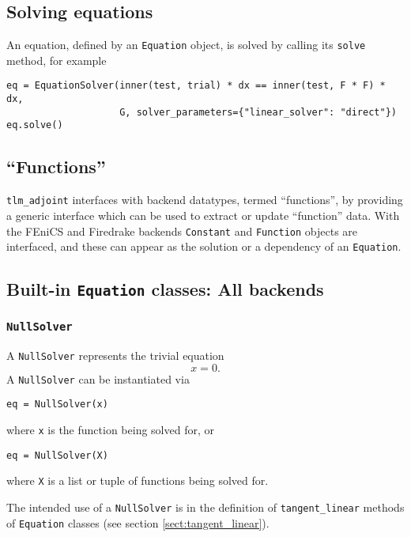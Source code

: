 \documentclass[11pt]{article}
\begin{document}
\subsection{Solving equations}

An equation, defined by an \texttt{Equation} object, is solved by calling its
\texttt{solve} method, for example
\begin{lstlisting}
eq = EquationSolver(inner(test, trial) * dx == inner(test, F * F) * dx,
                    G, solver_parameters={"linear_solver": "direct"})
eq.solve()
\end{lstlisting}

\subsection{``Functions''}

\texttt{tlm\_adjoint} interfaces with backend datatypes, termed ``functions'',
by providing a generic interface which can be used to extract or update
``function'' data. With the FEniCS and Firedrake backends \texttt{Constant} and
\texttt{Function} objects are interfaced, and these can appear as the solution
or a dependency of an \texttt{Equation}.

\subsection{Built-in \texttt{Equation} classes: All backends}

\subsubsection{\texttt{NullSolver}}

A \texttt{NullSolver} represents the trivial equation
\begin{equation*}
  x = 0.
\end{equation*}
A \texttt{NullSolver} can be instantiated via
\begin{lstlisting}
eq = NullSolver(x)
\end{lstlisting}
where \texttt{x} is the function being solved for, or
\begin{lstlisting}
eq = NullSolver(X)
\end{lstlisting}
where \texttt{X} is a list or tuple of functions being solved for.

The intended use of a \texttt{NullSolver} is in the definition of
\texttt{tangent\_linear} methods of \texttt{Equation} classes (see section
\ref{sect:tangent_linear}).
\end{document}
